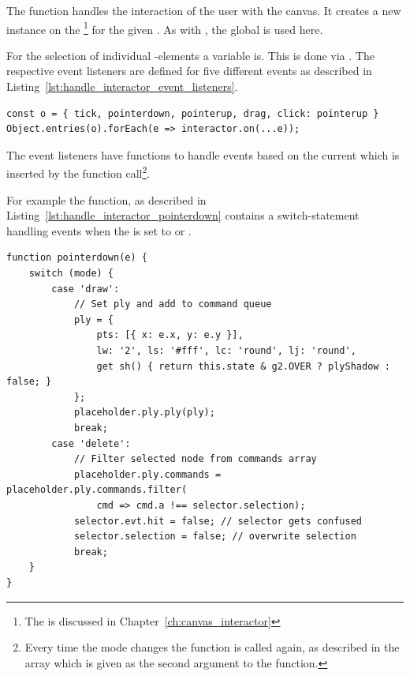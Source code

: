 The  function handles the interaction of the user with the canvas.
It creates a new instance on the \footnote{The  is discussed in Chapter~\ref{ch:canvas_interactor}} for the given .
As with , the global  is used here.

For the selection of individual -elements a  variable is.
This is done via .
The respective event listeners are defined for five different events as described in Listing~\ref{lst:handle_interactor_event_listeners}.

\begin{lstlisting}[label={lst:handle_interactor_event_listeners}, caption={Definition of event listeners on the \code{canvasInteractor}.}]
const o = { tick, pointerdown, pointerup, drag, click: pointerup }
Object.entries(o).forEach(e => interactor.on(...e));
\end{lstlisting}

The event listeners have functions to handle events based on the current  which is inserted by the function call\footnote{Every time the mode changes the function is called again, as described in the array which is given as the second argument to the  function.}.

For example the  function, as described in Listing~\ref{lst:handle_interactor_pointerdown} contains a switch-statement handling events when the  is set to  or .

\begin{lstlisting}[label={lst:handle_interactor_pointerdown}, caption={\code{pointerdown} function in \code{handleInteractor}.}]
function pointerdown(e) {
    switch (mode) {
        case 'draw':
            // Set ply and add to command queue
            ply = {
                pts: [{ x: e.x, y: e.y }],
                lw: '2', ls: '#fff', lc: 'round', lj: 'round',
                get sh() { return this.state & g2.OVER ? plyShadow : false; }
            };
            placeholder.ply.ply(ply);
            break;
        case 'delete':
            // Filter selected node from commands array
            placeholder.ply.commands = placeholder.ply.commands.filter(
                cmd => cmd.a !== selector.selection);
            selector.evt.hit = false; // selector gets confused
            selector.selection = false; // overwrite selection
            break;
    }
}
\end{lstlisting}


